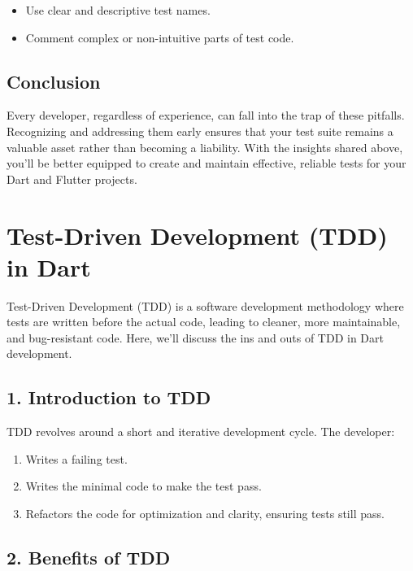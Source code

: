 \documentclass[
]{article}
\providecommand{\tightlist}{%
  \setlength{\itemsep}{0pt}\setlength{\parskip}{0pt}}
\begin{document}
\begin{itemize}
\tightlist
\item
  Use clear and descriptive test names.
\item
  Comment complex or non-intuitive parts of test code.
\end{itemize}

\subsection{Conclusion}\label{conclusion-13}

Every developer, regardless of experience, can fall into the trap of
these pitfalls. Recognizing and addressing them early ensures that your
test suite remains a valuable asset rather than becoming a liability.
With the insights shared above, you'll be better equipped to create and
maintain effective, reliable tests for your Dart and Flutter projects.

\section{Test-Driven Development (TDD) in
Dart}\label{test-driven-development-tdd-in-dart}

Test-Driven Development (TDD) is a software development methodology
where tests are written before the actual code, leading to cleaner, more
maintainable, and bug-resistant code. Here, we'll discuss the ins and
outs of TDD in Dart development.

\subsection{1. Introduction to TDD}\label{introduction-to-tdd}

TDD revolves around a short and iterative development cycle. The
developer:

\begin{enumerate}
\def\labelenumi{\arabic{enumi}.}
\tightlist
\item
  Writes a failing test.
\item
  Writes the minimal code to make the test pass.
\item
  Refactors the code for optimization and clarity, ensuring tests still
  pass.
\end{enumerate}

\subsection{2. Benefits of TDD}\label{benefits-of-tdd}
\end{document}
